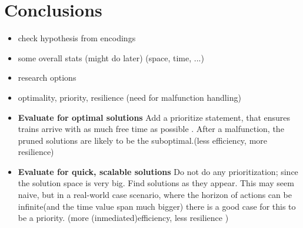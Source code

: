\section{Conclusions}
\color{blue}
\begin{itemize}
	\item check hypothesis from encodings
	\item some overall stats (might do later) (space, time, ...)
\end{itemize}
\color{black}

\color{green}
\begin{itemize}
	\item research options
	\item optimality, priority, resilience (need for malfunction handling)
\end{itemize}
\color{black}
\color{green}
\begin{itemize}
	\item  \textbf{Evaluate for optimal solutions} Add a prioritize statement, that ensures trains arrive with as much free time as possible . After a malfunction, the pruned solutions are likely to be the suboptimal.(less efficiency, more resilience)
	\item  \textbf{Evaluate for quick, scalable solutions} Do not do any prioritization; since the solution space is very big. Find solutions as they appear. This may seem naive, but in a real-world case scenario, where the horizon of actions can be infinite(and the time value span much bigger)  there is a good case for this to be a priority. (more (inmediated)efficiency, less resilience )
\end{itemize}
\color{black}